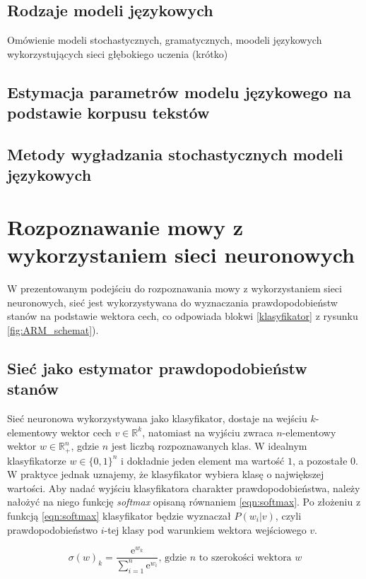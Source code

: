 \documentclass[11pt]{article}
\newcommand{\refBlock}[1]{%
	\hyperref[#1]{\ref*{#1}}%
}
\begin{document}
	
    \subsection{ Rodzaje modeli językowych }
      Omówienie modeli stochastycznych, gramatycznych, moodeli językowych wykorzystujących sieci głębokiego uczenia (krótko)
    \subsection{ Estymacja parametrów modelu językowego na podstawie korpusu tekstów }
    \subsection{ Metody wygładzania stochastycznych modeli językowych }


\section{Rozpoznawanie mowy z wykorzystaniem sieci neuronowych}
	\label{sec:ASR_NN}
	W prezentowanym podejściu do rozpoznawania mowy z wykorzystaniem sieci neuronowych, sieć jest wykorzystywana do wyznaczania prawdopodobieństw stanów na podstawie wektora cech, co odpowiada blokwi \refBlock{klasyfikator} z rysunku \ref{fig:ARM_schemat}).
	
	\subsection{Sieć jako estymator prawdopodobieństw stanów }
	\label{sec:nn_estymator}
		Sieć neuronowa wykorzystywana jako klasyfikator, dostaje na wejściu $k$-elementowy wektor cech $v \in \mathbb{R}^k$, natomiast na wyjściu zwraca $n$-elementowy wektor $w \in \mathbb{R}_+^n$, gdzie $n$ jest liczbą rozpoznawanych klas. W idealnym klasyfikatorze $w \in \{0,1\}^n$ i dokładnie jeden element ma wartość $1$, a pozostałe $0$. W praktyce jednak uznajemy, że klasyfikator wybiera klasę o największej wartości. Aby nadać wyjściu klasyfikatora charakter prawdopodobieństwa, należy nałożyć na niego funkcję \textit{softmax} opisaną równaniem \ref{eqn:softmax}. Po złożeniu z funkcją \ref{eqn:softmax} klasyfikator będzie wyznaczał $P(w_i|v)$, czyli prawdopodobieństwo $i$-tej klasy pod warunkiem wektora wejściowego $v$.
		
		\begin{equation}
			\sigma(w)_k=\frac{\mathrm{e}^{w_k}}{\sum_{i=1}^{n} \mathrm{e}^{w_i}}
			\text{,   gdzie $n$ to szerokości wektora $w$}
			\label{eqn:softmax}
		\end{equation}
		
\end{document}
